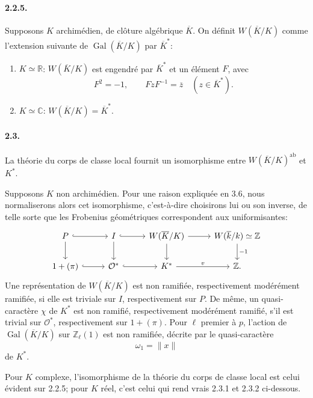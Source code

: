 \documentclass[10pt]{article}
\newcommand{\C}{\mathbb C}
\newcommand{\Z}{\mathbb Z}
\newcommand{\Gal}{\operatorname{Gal}}
\providecommand{\ab}{\mathrm{ab}}
\providecommand{\R}{\mathbb R}
\providecommand{\ab}{\mathrm{ab}}
\providecommand{\ab}{\mathrm{ab}}
\providecommand{\Gal}{\operatorname{Gal}}
\providecommand{\Gal}{\operatorname{Gal}}
\providecommand{\Gal}{\operatorname{Gal}}
\providecommand{\Gal}{\operatorname{Gal}}
\begin{document}
\paragraph{2.2.5.} Supposons \(K\) archimédien, de clôture algébrique \(\overline K\). On définit \(W(\overline K/K)\) comme l'extension suivante de \(\Gal(\overline K/K)\) par \(\overline K^*\):
\begin{enumerate}[label=\arabic*)]
\item \(K\simeq\R\): \(W(\overline K/K)\) est engendré par \(\overline K^*\) et un élément \(F\), avec
\[
F^2=-1,\qquad FzF^{-1}=\overline z\quad(z\in\overline K^*).
\]
\item \(K\simeq\C\): \(W(\overline K/K)=\overline K^*\).
\end{enumerate}

\paragraph{2.3.} La théorie du corps de classe local fournit un isomorphisme entre \(W(\overline K/K)^{\ab}\) et \(K^*\).

Supposons \(K\) non archimédien. Pour une raison expliquée en 3.6, nous normaliserons alors cet isomorphisme, c'est-à-dire choisirons lui ou son inverse, de telle sorte que les Frobenius géométriques correspondent aux uniformisantes:
\[
\begin{tikzcd}[column sep=2.7em,row sep=1.9em]
P \arrow[r,hook] \arrow[d] & I \arrow[r,hook] \arrow[d] &
W(\overline K/K) \arrow[r] \arrow[d] &
W(\overline k/k)\simeq\Z \arrow[d,"{-1}"]\\
1+(\pi) \arrow[r,hook] & \mathcal O^* \arrow[r,hook] &
K^* \arrow[r,"v"] & \Z .
\end{tikzcd}
\]
Une représentation de \(W(\overline K/K)\) est non ramifiée, respectivement modérément ramifiée, si elle est triviale sur \(I\), respectivement sur \(P\). De même, un quasi-caractère \(\chi\) de \(K^*\) est non ramifié, respectivement modérément ramifié, s'il est trivial sur \(\mathcal O^*\), respectivement sur \(1+(\pi)\). Pour \(\ell\) premier à \(p\), l'action de \(\Gal(\overline K/K)\) sur \(\Z_\ell(1)\) est non ramifiée, décrite par le quasi-caractère
\[
\omega_1=\|x\|
\]
de \(K^*\).

Pour \(K\) complexe, l'isomorphisme de la théorie du corps de classe local est celui évident sur 2.2.5; pour \(K\) réel, c'est celui qui rend vrais 2.3.1 et 2.3.2 ci-dessous.
\end{document}
